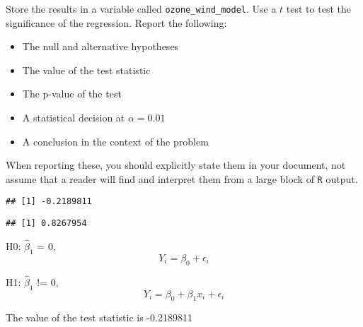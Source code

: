 \documentclass[
]{article}
\newenvironment{Shaded}{\begin{snugshade}}{\end{snugshade}}
\newcommand{\DataTypeTok}[1]{\textcolor[rgb]{0.13,0.29,0.53}{#1}}
\newcommand{\KeywordTok}[1]{\textcolor[rgb]{0.13,0.29,0.53}{\textbf{#1}}}
\newcommand{\NormalTok}[1]{#1}
\newcommand{\OperatorTok}[1]{\textcolor[rgb]{0.81,0.36,0.00}{\textbf{#1}}}
\newcommand{\StringTok}[1]{\textcolor[rgb]{0.31,0.60,0.02}{#1}}
\providecommand{\tightlist}{%
  \setlength{\itemsep}{0pt}\setlength{\parskip}{0pt}}
\begin{document}
Store the results in a variable called \texttt{ozone\_wind\_model}. Use
a \(t\) test to test the significance of the regression. Report the
following:

\begin{itemize}
\tightlist
\item
  The null and alternative hypotheses
\item
  The value of the test statistic
\item
  The p-value of the test
\item
  A statistical decision at \(\alpha = 0.01\)
\item
  A conclusion in the context of the problem
\end{itemize}

When reporting these, you should explicitly state them in your document,
not assume that a reader will find and interpret them from a large block
of \texttt{R} output.

\begin{Shaded}
\end{Shaded}

\begin{verbatim}
## [1] -0.2189811
\end{verbatim}

\begin{Shaded}
\end{Shaded}

\begin{verbatim}
## [1] 0.8267954
\end{verbatim}

H0: \(\hat{\beta}_1\) = 0, \[Y_i = \beta_0 + \epsilon_i\]

H1: \(\hat{\beta}_1\) != 0, \[Y_i = \beta_0 + \beta_1 x_i + \epsilon_i\]

The value of the test statistic is -0.2189811
\end{document}

